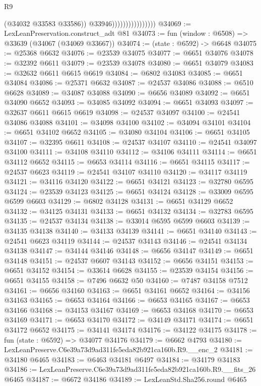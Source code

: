 \begin{lexlean}{R9}
\begin{coremodule}
                                      (@34032 @33583 @33586))
                                    @33946))))))))))))))))
@34069 := LexLeanPreservation.construct_adt @81
@34073 := fun (window : @6508) => @33639 (@34067 (@34069 @33667))
@34074 := (state : @6592) -> @6648
@34075 := @25368 @6632
@34076 := @23539 @34075
@34077 := @6651 @34076
@34078 := @32392 @6611
@34079 := @23539 @34078
@34080 := @6651 @34079
@34083 := @32632 @6611 @6615 @6619
@34084 := @6802 @34083
@34085 := @6651 @34084
@34086 := @25371 @6632
@34087 := @24537 @34086
@34088 := @6510 @6628
@34089 := @34087 @34088
@34090 := @6656 @34089
@34092 := @6651 @34090 @6652
@34093 := @34085 @34092
@34094 := @6651 @34093
@34097 := @32637 @6611 @6615 @6619
@34098 := @24537 @34097
@34100 := @24541 @34086 @34088
@34101 := @34098 @34100
@34102 := @34094 @34101
@34104 := @6651 @34102 @6652
@34105 := @34080 @34104
@34106 := @6651 @34105
@34107 := @32395 @6611
@34108 := @24537 @34107
@34110 := @24541 @34097 @34100
@34111 := @34108 @34110
@34112 := @34106 @34111
@34114 := @6651 @34112 @6652
@34115 := @6653 @34114
@34116 := @6651 @34115
@34117 := @24537 @6623
@34119 := @24541 @34107 @34110
@34120 := @34117 @34119
@34121 := @34116 @34120
@34122 := @6651 @34121
@34123 := @32780 @6595
@34124 := @23539 @34123
@34125 := @6651 @34124
@34128 := @33009 @6595 @6599 @6603
@34129 := @6802 @34128
@34131 := @6651 @34129 @6652
@34132 := @34125 @34131
@34133 := @6651 @34132
@34134 := @32783 @6595
@34135 := @24537 @34134
@34138 := @33014 @6595 @6599 @6603
@34139 := @34135 @34138
@34140 := @34133 @34139
@34141 := @6651 @34140
@34143 := @24541 @6623 @34119
@34144 := @24537 @34143
@34146 := @24541 @34134 @34138
@34147 := @34144 @34146
@34148 := @6656 @34147
@34149 := @6651 @34148
@34151 := @24537 @6607 @34143
@34152 := @6656 @34151
@34153 := @6651 @34152
@34154 := @33614 @6628
@34155 := @23539 @34154
@34156 := @6651 @34155
@34158 := @7496 @6632 @50
@34160 := @7487 @34158 @7512
@34161 := @6656 @34160
@34163 := @6651 @34161 @6652
@34164 := @34156 @34163
@34165 := @6653 @34164
@34166 := @6653 @34165
@34167 := @6653 @34166
@34168 := @34153 @34167
@34169 := @6653 @34168
@34170 := @6653 @34169
@34171 := @6653 @34170
@34172 := @34149 @34171
@34174 := @6651 @34172 @6652
@34175 := @34141 @34174
@34176 := @34122 @34175
@34178 := fun (state : @6592) => @34077 @34176
@34179 := @6662 @4793
@34180 := LexLeanPreserve.C6e39a73d9ad311fe5eda82b921ca160b.R9.__enc_2
@34181 := @34180 @6465
@34183 := @6463 @34181 @6497
@34184 := @34179 @34183
@34186 := LexLeanPreserve.C6e39a73d9ad311fe5eda82b921ca160b.R9.__fits_26 @6465
@34187 := @6672 @34186
@34189 := LexLeanStd.Sha256.round @6465

\end{coremodule}
\end{lexlean}
